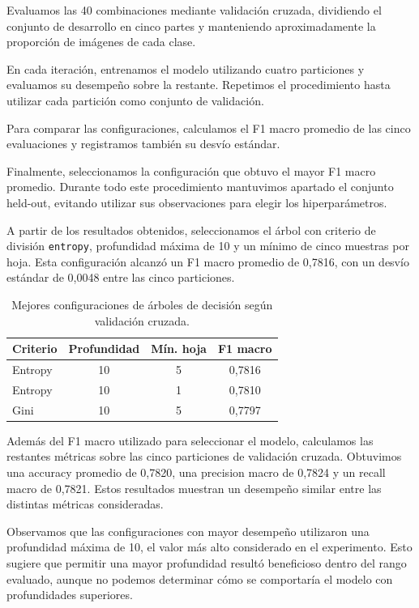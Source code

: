 \documentclass[11pt,a4paper]{article}
\begin{document}
Evaluamos las 40 combinaciones mediante validación cruzada, 
dividiendo el conjunto de desarrollo en cinco partes y 
manteniendo aproximadamente la proporción de imágenes de 
cada clase.

En cada iteración, entrenamos el modelo utilizando
cuatro particiones y evaluamos su desempeño sobre
la restante. Repetimos el procedimiento hasta
utilizar cada partición como conjunto de validación.

Para comparar las configuraciones, calculamos
el F1 macro promedio de las cinco evaluaciones
y registramos también su desvío estándar.

Finalmente, seleccionamos la configuración
que obtuvo el mayor F1 macro promedio.
Durante todo este procedimiento mantuvimos
apartado el conjunto held-out, evitando utilizar
sus observaciones para elegir los hiperparámetros.

A partir de los resultados obtenidos, seleccionamos
el árbol con criterio de división \texttt{entropy},
profundidad máxima de 10 y un mínimo de cinco
muestras por hoja. Esta configuración alcanzó
un F1 macro promedio de 0,7816, con un desvío
estándar de 0,0048 entre las cinco particiones.

\begin{table}[H]
    \centering
    \caption{Mejores configuraciones de árboles
    de decisión según validación cruzada.}
    \label{tab:mejores_arboles}

    \begin{tabular}{lccc}
        \toprule
        Criterio & Profundidad & Mín. hoja & F1 macro \\
        \midrule
        Entropy & 10 & 5 & 0,7816 \\
        Entropy & 10 & 1 & 0,7810 \\
        Gini & 10 & 5 & 0,7797 \\
        \bottomrule
    \end{tabular}
\end{table}



Además del F1 macro utilizado para seleccionar
el modelo, calculamos las restantes métricas
sobre las cinco particiones de validación cruzada.
Obtuvimos una accuracy promedio de 0,7820,
una precision macro de 0,7824 y un recall macro
de 0,7821. Estos resultados muestran un desempeño
similar entre las distintas métricas consideradas.

Observamos que las configuraciones con mayor
desempeño utilizaron una profundidad máxima de 10,
el valor más alto considerado en el experimento.
Esto sugiere que permitir una mayor profundidad
resultó beneficioso dentro del rango evaluado,
aunque no podemos determinar cómo se comportaría
el modelo con profundidades superiores.
\end{document}
